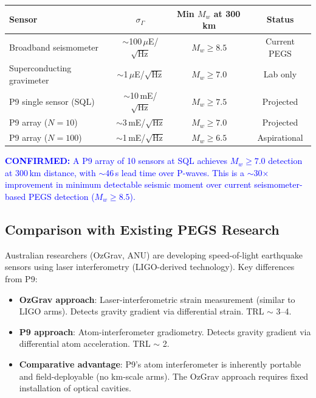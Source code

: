 \documentclass[11pt]{article}
\theoremstyle{definition}
\theoremstyle{remark}
\newcommand{\confirmed}[1]{\textcolor{blue}{\textbf{CONFIRMED:} #1}}
\begin{document}
\begin{center}
\begin{tabular}{lccc}
\toprule
\textbf{Sensor} & \textbf{$\sigma_\Gamma$} & \textbf{Min $M_w$ at 300\,km} & \textbf{Status} \\
\midrule
Broadband seismometer & $\sim$100\,$\mu$E/$\sqrt{\text{Hz}}$ & $M_w \geq 8.5$ & Current PEGS \\
Superconducting gravimeter & $\sim$1\,$\mu$E/$\sqrt{\text{Hz}}$ & $M_w \geq 7.0$ & Lab only \\
P9 single sensor (SQL) & $\sim$10\,mE/$\sqrt{\text{Hz}}$ & $M_w \geq 7.5$ & Projected \\
P9 array ($N = 10$) & $\sim$3\,mE/$\sqrt{\text{Hz}}$ & $M_w \geq 7.0$ & Projected \\
P9 array ($N = 100$) & $\sim$1\,mE/$\sqrt{\text{Hz}}$ & $M_w \geq 6.5$ & Aspirational \\
\bottomrule
\end{tabular}
\end{center}

\begin{tcolorbox}[colback=green!5!white, colframe=green!70!black]
\confirmed{A P9 array of 10 sensors at SQL achieves $M_w \geq 7.0$ detection
at 300\,km distance, with $\sim$46\,s lead time over P-waves. This is a
$\sim$30$\times$ improvement in minimum detectable seismic moment over
current seismometer-based PEGS detection ($M_w \geq 8.5$).}
\end{tcolorbox}

\subsection{Comparison with Existing PEGS Research}

Australian researchers (OzGrav, ANU) are developing speed-of-light earthquake
sensors using laser interferometry (LIGO-derived technology). Key differences
from P9:
\begin{itemize}
  \item \textbf{OzGrav approach}: Laser-interferometric strain measurement
    (similar to LIGO arms). Detects gravity gradient via differential strain.
    TRL $\sim$ 3--4.
  \item \textbf{P9 approach}: Atom-interferometer gradiometry. Detects gravity
    gradient via differential atom acceleration. TRL $\sim$ 2.
  \item \textbf{Comparative advantage}: P9's atom interferometer is inherently
    portable and field-deployable (no km-scale arms). The OzGrav approach
    requires fixed installation of optical cavities.
\end{itemize}
\end{document}
